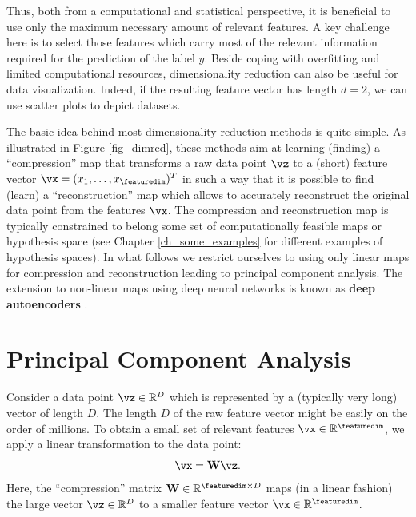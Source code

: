 \documentclass[12pt]{report}
\begin{document}
Thus, both from a computational and statistical perspective, it is beneficial to use 
only the maximum necessary amount of relevant features. A key challenge here is 
to select those features which carry most of the relevant information required for 
the prediction of the label $y$. Beside coping with overfitting and limited computational 
resources, dimensionality reduction can also be useful for data visualization. Indeed, if 
the resulting feature vector has length $d=2$, we can use scatter plots to depict datasets. 

The basic idea behind most dimensionality reduction methods is quite simple. As 
illustrated in Figure \ref{fig_dimred}, these methods aim at learning (finding) a ``compression'' 
map that transforms a raw data point $\vz$ to a (short) feature vector $\vx=(x_{1},\ldots,x_{\featuredim})^{T}$ 
in such a way that it is possible to find (learn) a ``reconstruction'' map which allows to accurately 
reconstruct the original data point from the features $\vx$. The compression and reconstruction 
map is typically constrained to belong some set of computationally feasible maps or hypothesis 
space (see Chapter \ref{ch_some_examples} for different examples of hypothesis spaces). In what 
follows we restrict ourselves to using only linear maps for compression and reconstruction leading 
to principal component analysis. The extension to non-linear maps using deep neural networks 
is known as {\bf deep autoencoders} \cite[Ch. 14]{Goodfellow-et-al-2016}. 


\section{Principal Component Analysis} 
\label{sec_pca}

Consider a data point $\vz \in \mathbb{R}^{D}$ which is represented by a (typically very long) 
vector of length $D$. The length $D$ of the raw feature vector might be easily on the order of 
millions. To obtain a small set of relevant features $\vx \in \mathbb{R}^{\featuredim}$, we apply 
a linear transformation to the data point: 
\begin{equation} 
\label{equ_feat_learning_matrix}
\vx = \mathbf{W} \vz.
\end{equation}
Here, the ``compression'' matrix $\mathbf{W} \in \mathbb{R}^{\featuredim \times D}$ maps 
(in a linear fashion) the large vector $\vz \in \mathbb{R}^{D}$ to a smaller feature vector $\vx \in \mathbb{R}^{\featuredim}$. %
\end{document}
